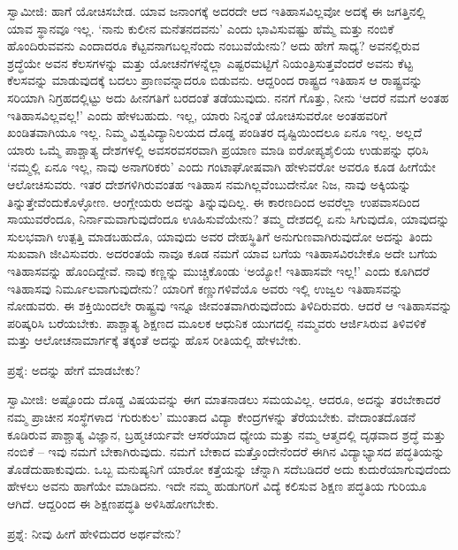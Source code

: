 ಸ್ವಾಮೀಜಿ: ಹಾಗೆ ಯೋಚಿಸಬೇಡ. ಯಾವ ಜನಾಂಗಕ್ಕೆ ಅದರದೇ ಆದ ಇತಿಹಾಸವಿಲ್ಲವೋ ಅದಕ್ಕೆ ಈ ಜಗತ್ತಿನಲ್ಲಿ ಯಾವ ಸ್ಥಾನವೂ ಇಲ್ಲ. ‘ನಾನು ಕುಲೀನ ಮನೆತನದವನು’ ಎಂದು ಭಾವಿಸುವಷ್ಟು ಹೆಮ್ಮೆ ಮತ್ತು ನಂಬಿಕೆ ಹೊಂದಿರುವವನು ಎಂದಾದರೂ ಕೆಟ್ಟವನಾಗಬಲ್ಲನೆಂದು ನಂಬುವೆಯೇನು? ಅದು ಹೇಗೆ ಸಾಧ್ಯ? ಅವನಲ್ಲಿರುವ ಶ್ರದ್ಧೆಯೇ ಅವನ ಕೆಲಸಗಳನ್ನು ಮತ್ತು ಯೋಚನೆಗಳನ್ನೆಲ್ಲಾ ಎಷ್ಟರಮಟ್ಟಿಗೆ ನಿಯಂತ್ರಿಸುತ್ತವೆಂದರೆ ಅವನು ಕೆಟ್ಟ ಕೆಲಸವನ್ನು ಮಾಡುವುದಕ್ಕೆ ಬದಲು ಪ್ರಾಣವನ್ನಾದರೂ ಬಿಡುವನು. ಆದ್ದರಿಂದ ರಾಷ್ಟ್ರದ ಇತಿಹಾಸ ಆ ರಾಷ್ಟ್ರವನ್ನು ಸರಿಯಾಗಿ ನಿಗ್ರಹದಲ್ಲಿಟ್ಟು ಅದು ಹೀನಗತಿಗೆ ಬರದಂತೆ ತಡೆಯುವುದು. ನನಗೆ ಗೊತ್ತು, ನೀನು ‘ಆದರೆ ನಮಗೆ ಅಂತಹ ಇತಿಹಾಸವಿಲ್ಲವಲ್ಲ!’ ಎಂದು ಹೇಳಬಹುದು. ಇಲ್ಲ, ಯಾರು ನಿನ್ನಂತೆ ಯೋಚಿಸುವರೋ ಅಂತಹವರಿಗೆ ಖಂಡಿತವಾಗಿಯೂ ಇಲ್ಲ. ನಿಮ್ಮ ವಿಶ್ವವಿದ್ಯಾನಿಲಯದ ದೊಡ್ಡ ಪಂಡಿತರ ದೃಷ್ಟಿಯಿಂದಲೂ ಏನೂ ಇಲ್ಲ. ಅಲ್ಲದೆ ಯಾರು ಒಮ್ಮೆ ಪಾಶ್ಚಾತ್ಯ ದೇಶಗಳಲ್ಲಿ ಅವಸರವಸರವಾಗಿ ಪ್ರಯಾಣ ಮಾಡಿ ಐರೋಪ್ಯಶೈಲಿಯ ಉಡುಪನ್ನು ಧರಿಸಿ ‘ನಮ್ಮಲ್ಲಿ ಏನೂ ಇಲ್ಲ, ನಾವು ಅನಾಗರಿಕರು’ ಎಂದು ಗಂಟಾಘೋಷವಾಗಿ ಹೇಳುವರೋ ಅವರೂ ಕೂಡ ಹೀಗೆಯೇ ಆಲೋಚಿಸುವರು. ಇತರ ದೇಶಗಳಿಗಿರುವಂತಹ ಇತಿಹಾಸ ನಮಗಿಲ್ಲವೆಂಬುದೇನೋ ನಿಜ, ನಾವು ಅಕ್ಕಿಯನ್ನು ತಿನ್ನುತ್ತೇವೆಂದುಕೊಳ್ಳೋಣ. ಆಂಗ್ಲೇಯರು ಅದನ್ನು ತಿನ್ನುವುದಿಲ್ಲ. ಈ ಕಾರಣದಿಂದ ಅವರೆಲ್ಲಾ ಉಪವಾಸದಿಂದ ಸಾಯುವರೆಂದೂ, ನಿರ್ನಾಮವಾಗುವುದೆಂದೂ ಊಹಿಸುವೆಯೇನು? ತಮ್ಮ ದೇಶದಲ್ಲಿ ಏನು ಸಿಗುವುದೊ, ಯಾವುದನ್ನು ಸುಲಭವಾಗಿ ಉತ್ಪತ್ತಿ ಮಾಡಬಹುದೊ, ಯಾವುದು ಅವರ ದೇಹಸ್ಥಿತಿಗೆ ಅನುಗುಣವಾಗಿರುವುದೋ ಅದನ್ನು ತಿಂದು ಸುಖವಾಗಿ ಜೀವಿಸುವರು. ಅದರಂತಯೆ ನಾವೂ ಕೂಡ ನಮಗೆ ಯಾವ ಬಗೆಯ ಇತಿಹಾಸವಿರಬೇಕೊ ಅದೇ ಬಗೆಯ ಇತಿಹಾಸವನ್ನು ಹೊಂದಿದ್ದೇವೆ. ನಾವು ಕಣ್ಣನ್ನು ಮುಚ್ಚಿಕೊಂಡು ‘ಅಯ್ಯೋ! ಇತಿಹಾಸವೇ ಇಲ್ಲ!’ ಎಂದು ಕೂಗಿದರೆ ಇತಿಹಾಸವು ನಿರ್ಮೂಲವಾಗುವುದೇನು? ಯಾರಿಗೆ ಕಣ್ಣುಗಳಿವೆಯೊ ಅವರು ಇಲ್ಲಿ ಉಜ್ವಲ ಇತಿಹಾಸವನ್ನು ನೋಡುವರು. ಈ ಶಕ್ತಿಯಿಂದಲೇ ರಾಷ್ಟ್ರವು ಇನ್ನೂ ಜೀವಂತವಾಗಿರುವುದೆಂದು ತಿಳಿದಿರುವರು. ಆದರೆ ಆ ಇತಿಹಾಸವನ್ನು ಪರಿಷ್ಕರಿಸಿ ಬರೆಯಬೇಕು. ಪಾಶ್ಚಾತ್ಯ ಶಿಕ್ಷಣದ ಮೂಲಕ ಆಧುನಿಕ ಯುಗದಲ್ಲಿ ನಮ್ಮವರು ಆರ್ಜಿಸಿರುವ ತಿಳಿವಳಿಕೆ ಮತ್ತು ಆಲೋಚನಾಮಾರ್ಗಕ್ಕೆ ತಕ್ಕಂತೆ ಅದನ್ನು ಹೊಸ ರೀತಿಯಲ್ಲಿ ಹೇಳಬೇಕು.

ಪ್ರಶ್ನೆ: ಅದನ್ನು ಹೇಗೆ ಮಾಡಬೇಕು?

ಸ್ವಾಮೀಜಿ: ಅಷ್ಟೊಂದು ದೊಡ್ಡ ವಿಷಯವನ್ನು ಈಗ ಮಾತನಾಡಲು ಸಮಯವಿಲ್ಲ. ಆದರೂ, ಅದನ್ನು ತರಬೇಕಾದರೆ ನಮ್ಮ ಪ್ರಾಚೀನ ಸಂಸ್ಥೆಗಳಾದ ‘ಗುರುಕುಲ’ ಮುಂತಾದ ವಿದ್ಯಾ ಕೇಂದ್ರಗಳನ್ನು ತೆರೆಯಬೇಕು. ವೇದಾಂತದೊಡನೆ ಕೂಡಿರುವ ಪಾಶ್ಚಾತ್ಯ ವಿಜ್ಞಾನ, ಬ್ರಹ್ಮಚರ್ಯವೇ ಆಸರೆಯಾದ ಧ್ಯೇಯ ಮತ್ತು ನಮ್ಮ ಆತ್ಮದಲ್ಲಿ ದೃಢವಾದ ಶ್ರದ್ಧೆ ಮತ್ತು ನಂಬಿಕೆ – ಇವು ನಮಗೆ ಬೇಕಾಗಿರುವುದು. ನಮಗೆ ಬೇಕಾದ ಮತ್ತೊಂದೇನೆಂದರೆ ಈಗಿನ ವಿದ್ಯಾಭ್ಯಾಸದ ಪದ್ಧತಿಯನ್ನು ತೊಡೆದುಹಾಕುವುದು. ಒಬ್ಬ ಮನುಷ್ಯನಿಗೆ ಯಾರೋ ಕತ್ತೆಯನ್ನು ಚೆನ್ನಾಗಿ ಸದೆಬಡಿದರೆ ಅದು ಕುದುರೆಯಾಗುವುದೆಂದು ಹೇಳಲು ಅವನು ಹಾಗೆಯೇ ಮಾಡಿದನು. ಇದೇ ನಮ್ಮ ಹುಡುಗರಿಗೆ ವಿದ್ಯೆ ಕಲಿಸುವ ಶಿಕ್ಷಣ ಪದ್ಧತಿಯ ಗುರಿಯೂ ಆಗಿದೆ. ಆದ್ದರಿಂದ ಈ ಶಿಕ್ಷಣಪದ್ಧತಿ ಅಳಿಸಿಹೋಗಬೇಕು.

ಪ್ರಶ್ನೆ: ನೀವು ಹೀಗೆ ಹೇಳಿದುದರ ಅರ್ಥವೇನು?

